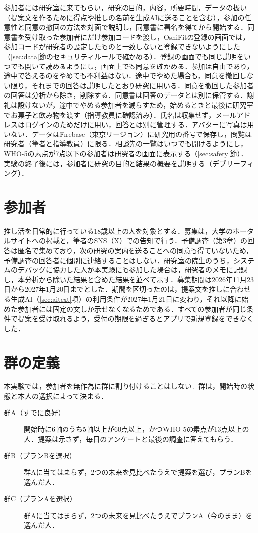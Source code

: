 参加者には研究室に来てもらい，研究の目的，内容，所要時間，データの扱い（提案文を作るために得点や推しの名前を生成AIに送ることを含む），参加の任意性と同意の撤回の方法を対面で説明し，同意書に署名を得てから開始する．同意書を受け取った参加者にだけ参加コードを渡し，OshiFitの登録の画面では，参加コードが研究者の設定したものと一致しないと登録できないようにした（\ref{sec:data}節のセキュリティルールで確かめる）．登録の画面でも同じ説明をいつでも開いて読めるようにし，画面上でも同意を確かめる．参加は自由であり，途中で答えるのをやめても不利益はない．途中でやめた場合も，同意を撤回しない限り，それまでの回答は説明したとおり研究に用いる．同意を撤回した参加者の回答は分析から除き，削除する．同意書は回答のデータとは別に保管する．謝礼は設けないが，途中でやめる参加者を減らすため，始めるときと最後に研究室でお菓子と飲み物を渡す（指導教員に確認済み）．氏名は収集せず，メールアドレスはログインのためだけに用い，回答とは別に管理する．アバターに写真は用いない．データはFirebase（東京リージョン）に研究用の番号で保存し，閲覧は研究者（筆者と指導教員）に限る．相談先の一覧はいつでも開けるようにし，WHO-5の素点が7点以下の参加者は研究者の画面に表示する（\ref{sec:safety}節）．実験の終了後には，参加者に研究の目的と結果の概要を説明する（デブリーフィング）．

\section{参加者}
推し活を日常的に行っている18歳以上の人を対象とする．募集は，大学のポータルサイトへの掲載と，筆者のSNS（X）での告知で行う．予備調査（第3章）の回答は匿名で集めており，次の研究の案内を送ることへの同意も得ていないため，予備調査の回答者に個別に連絡することはしない．研究室の院生のうち，システムのデバッグに協力した人が本実験にも参加した場合は，研究者のメモに記録し，本分析から除いた結果と含めた結果を並べて示す．募集期間は2026年11月23日から2027年1月20日までとした．期間を区切ったのは，提案文を推しに合わせる生成AI（\ref{sec:aitext}項）の利用条件が2027年1月21日に変わり，それ以降に始めた参加者には固定の文しか示せなくなるためである．すべての参加者が同じ条件で提案を受け取れるよう，受付の期限を過ぎるとアプリで新規登録をできなくした．

\section{群の定義}
本実験では，参加者を無作為に群に割り付けることはしない．群は，開始時の状態と本人の選択によって決まる．
\begin{description}
\item[群A（すでに良好）] 開始時に6軸のうち5軸以上が60点以上，かつWHO-5の素点が13点以上の人．提案は示さず，毎日のアンケートと最後の調査に答えてもらう．
\item[群B（プランBを選択）] 群Aに当てはまらず，2つの未来を見比べたうえで提案を選び，プランBを選んだ人．
\item[群C（プランAを選択）] 群Aに当てはまらず，2つの未来を見比べたうえでプランA（今のまま）を選んだ人．
\end{description}

